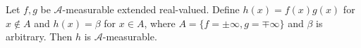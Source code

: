 Let $f, g$ be $\mathcal{A}$-measurable extended real-valued. Define $h(x) = f(x)g(x)$ for $x \notin A$ and $h(x) = \beta$ for $x \in A$, where $A = \{f = \pm\infty, g = \mp\infty\}$ and $\beta$ is arbitrary. Then $h$ is $\mathcal{A}$-measurable.